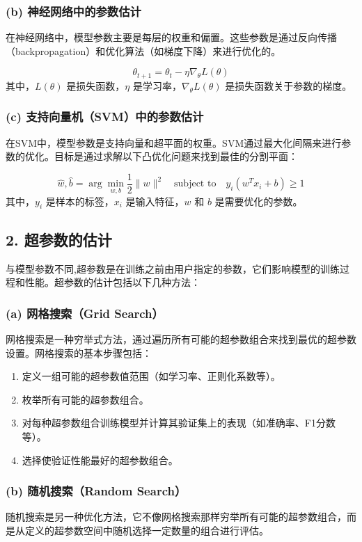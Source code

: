 \documentclass{article}
\begin{document}
\subsubsection*{(b) 神经网络中的参数估计}
在神经网络中，模型参数主要是每层的权重和偏置。这些参数是通过反向传播（backpropagation）和优化算法（如梯度下降）来进行优化的。

\[
\theta_{t+1} = \theta_t - \eta \nabla_\theta L(\theta)
\]
其中，$L(\theta)$ 是损失函数，$\eta$ 是学习率，$\nabla_\theta L(\theta)$ 是损失函数关于参数的梯度。

\subsubsection*{(c) 支持向量机（SVM）中的参数估计}
在SVM中，模型参数是支持向量和超平面的权重。SVM通过最大化间隔来进行参数的优化。目标是通过求解以下凸优化问题来找到最佳的分割平面：

\[
\hat{w}, \hat{b} = \arg\min_{w,b} \frac{1}{2} \|w\|^2 \quad \text{subject to} \quad y_i (w^T x_i + b) \geq 1
\]
其中，$y_i$ 是样本的标签，$x_i$ 是输入特征，$w$ 和 $b$ 是需要优化的参数。

\subsection*{2. 超参数的估计}

与模型参数不同,超参数是在训练之前由用户指定的参数，它们影响模型的训练过程和性能。超参数的估计包括以下几种方法：

\subsubsection*{(a) 网格搜索（Grid Search）}
网格搜索是一种穷举式方法，通过遍历所有可能的超参数组合来找到最优的超参数设置。网格搜索的基本步骤包括：

\begin{enumerate}
    \item 定义一组可能的超参数值范围（如学习率、正则化系数等）。
    \item 枚举所有可能的超参数组合。
    \item 对每种超参数组合训练模型并计算其验证集上的表现（如准确率、F1分数等）。
    \item 选择使验证性能最好的超参数组合。
\end{enumerate}

\subsubsection*{(b) 随机搜索（Random Search）}
随机搜索是另一种优化方法，它不像网格搜索那样穷举所有可能的超参数组合，而是从定义的超参数空间中随机选择一定数量的组合进行评估。
\end{document}
